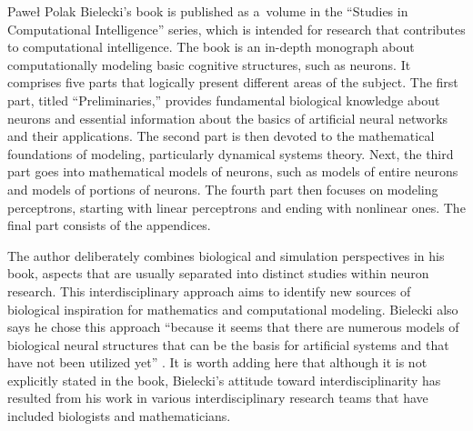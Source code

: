 \begin{newrevengenv}{Paweł Polak}
Bielecki's book is published as a~volume in the ``Studies in Computational Intelligence'' series, which is intended for research that contributes to computational intelligence. The book is an in-depth monograph about computationally modeling basic cognitive structures, such as neurons. It comprises five parts that logically present different areas of the subject. The first part, titled ``Preliminaries,'' provides fundamental biological knowledge about neurons and essential information about the basics of artificial neural networks and their applications. The second part is then devoted to the mathematical foundations of modeling, particularly dynamical systems theory. Next, the third part goes into mathematical models of neurons, such as models of entire neurons and models of portions of neurons. The fourth part then focuses on modeling perceptrons, starting with linear perceptrons and ending with nonlinear ones. The final part consists of the appendices.

The author deliberately combines biological and simulation perspectives in his book, aspects that are usually separated into distinct studies within neuron research. This interdisciplinary approach aims to identify new sources of biological inspiration for mathematics and computational modeling. Bielecki also says he chose this approach ``because it seems that there are numerous models of biological neural structures that can be the basis for artificial systems and that have not been utilized yet''
\parencite[][p.3]{bielecki_models_2019}. %
 It is worth adding here that although it is not explicitly stated in the book, Bielecki's attitude toward interdisciplinarity has resulted from his work in various interdisciplinary research teams that have included biologists and mathematicians.


\end{newrevengenv}

